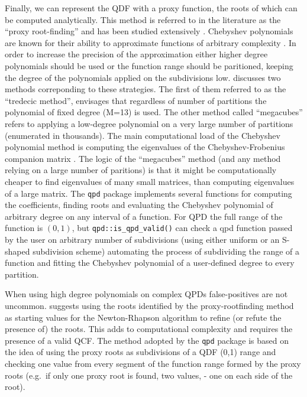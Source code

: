 \documentclass[
  12pt,
]{article}
\begin{document}
Finally, we can represent the QDF with a proxy function, the roots of which can be computed analytically. This method is referred to in the literature as the ``proxy root-finding'' and has been studied extensively \citep{boyd2013FindingZerosUnivariate}. Chebyshev polynomials are known for their ability to approximate functions of arbitrary complexity \citep{boyd2007NumericalExperimentsAccuracy}. In order to increase the precision of the approximation either higher degree polynomials should be used or the function range should be paritioned, keeping the degree of the polynomials applied on the subdivisions low. \citet{boyd2006ComputingRealRoots} discusses two methods correponding to these strategies. The first of them referred to as the ``tredecic method'', envisages that regardless of number of partitions the polynomial of fixed degree (M=13) is used. The other method called ``megacubes'' refers to applying a low-degree polynomial on a very large number of partitions (enumerated in thousands). The main computational load of the Chebyshev polynomial method is computing the eigenvalues of the Chebyshev-Frobenius companion matrix \citep{boyd2013FindingZerosUnivariate}. The logic of the ``megacubes'' method (and any method relying on a large number of paritions) is that it might be computationally cheaper to find eigenvalues of many small matrices, than computing eigenvalues of a large matrix. The \texttt{qpd} package \citep{perepolkin2019QpdToolsQuantileparameterized} implements several functions for computing the coefficients, finding roots and evaluating the Chebyshev polynomial of arbitrary degree on any interval of a function. For QPD the full range of the function is \((0,1)\), but \texttt{qpd::is\_qpd\_valid()} can check a qpd function passed by the user on arbitrary number of subdivisions (using either uniform or an S-shaped subdivision scheme) automating the process of subdividing the range of a function and fitting the Chebyshev polynomial of a user-defined degree to every partition.

When using high degree polynomials on complex QPDs false-positives are not uncommon. \citet{boyd2006ComputingRealRoots} suggests using the roots identified by the proxy-rootfinding method as starting values for the Newton-Rhapson algorithm to refine (or refute the presence of) the roots. This adds to computational complexity and requires the presence of a valid QCF. The method adopted by the \texttt{qpd} package is based on the idea of using the proxy roots as subdivisions of a QDF (0,1) range and checking one value from every segment of the function range formed by the proxy roots (e.g.~if only one proxy root is found, two values, - one on each side of the root).
\end{document}
